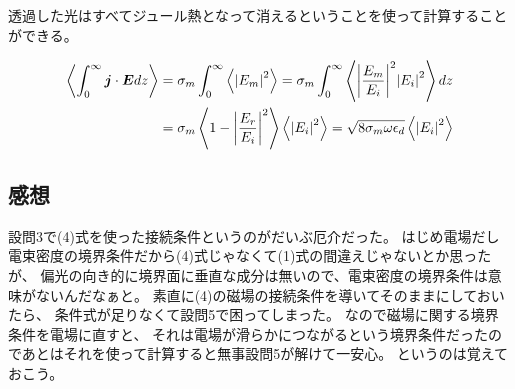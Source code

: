 \documentclass[../../sp_2013.tex]{subfiles}
\begin{document}
\subsection{}
透過した光はすべてジュール熱となって消えるということを使って計算することができる。

\begin{equation}\begin{aligned}[b]
    \ev{\int_{0}^{\infty}\vb*{j}\cdot \vb*{E}dz}
    &= \sigma_m \int_{0}^{\infty} \ev{\abs{E_m}^2}
    = \sigma_m \int_{0}^{\infty} \ev{\abs{\frac{E_m}{E_i}}^2\abs{E_i}^2}dz\\
    &= \sigma_m  \ev{1-\abs{\frac{E_r}{E_i}}^2}\ev{\abs{E_i}^2}
    = \sqrt{8\sigma_m \omega \epsilon_d}\ev{\abs{E_i}^2}
\end{aligned}\end{equation}

\subsection*{感想}
設問3で(4)式を使った接続条件というのがだいぶ厄介だった。
はじめ電場だし電束密度の境界条件だから(4)式じゃなくて(1)式の間違えじゃないとか思ったが、
偏光の向き的に境界面に垂直な成分は無いので、電束密度の境界条件は意味がないんだなぁと。
素直に(4)の磁場の接続条件を導いてそのままにしておいたら、
条件式が足りなくて設問5で困ってしまった。
なので磁場に関する境界条件を電場に直すと、
それは電場が滑らかにつながるという境界条件だったのであとはそれを使って計算すると無事設問5が解けて一安心。
というのは覚えておこう。
\end{document}
